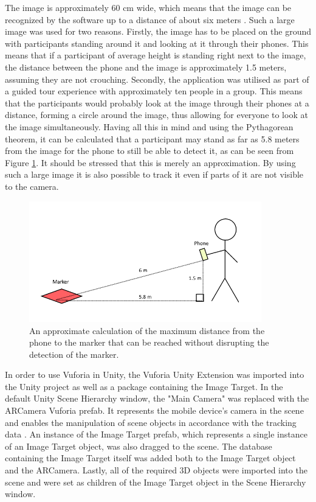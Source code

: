 The image is approximately 60 cm wide, which means that the image can be recognized by the software up to a distance of about six meters \cite{calculate_distance_from_image}. Such a large image was used for two reasons. Firstly, the image has to be placed on the ground with participants standing around it and looking at it through their phones. This means that if a participant of average height is standing right next to the image, the distance between the phone and the image is approximately 1.5 meters, assuming they are not crouching. Secondly, the application was utilised as part of a guided tour experience with approximately ten people in a group. This means that the participants would probably look at the image through their phones at a distance, forming a circle around the image, thus allowing for everyone to look at the image simultaneously. Having all this in mind and using the Pythagorean theorem, it can be calculated that a participant may stand as far as 5.8 meters from the image for the phone to still be able to detect it, as can be seen from Figure \ref{fig:imp3}. It should be stressed that this is merely an approximation. By using such a large image it is also possible to track it even if parts of it are not visible to the camera. 

\begin{figure}[h!]
    \centering
    \includegraphics[width=0.9\textwidth]{figures/imp3.png}
    \caption{An approximate calculation of the maximum distance from the phone to the marker that can be reached without disrupting the detection of the marker.}\label{fig:imp3}
\end{figure}

In order to use Vuforia in Unity, the Vuforia Unity Extension was imported into the Unity project as well as a package containing the Image Target. In the default Unity Scene Hierarchy window, the "Main Camera" was replaced with the ARCamera Vuforia prefab. It represents the mobile device's camera in the scene and enables the manipulation of scene objects in accordance with the tracking data \cite{getting_started}. An instance of the Image Target prefab, which represents a single instance of an Image Target object, was also dragged to the scene. The database containing the Image Target itself was added both to the Image Target object and the ARCamera. Lastly, all of the required 3D objects were imported into the scene and were set as children of the Image Target object in the Scene Hierarchy window.



